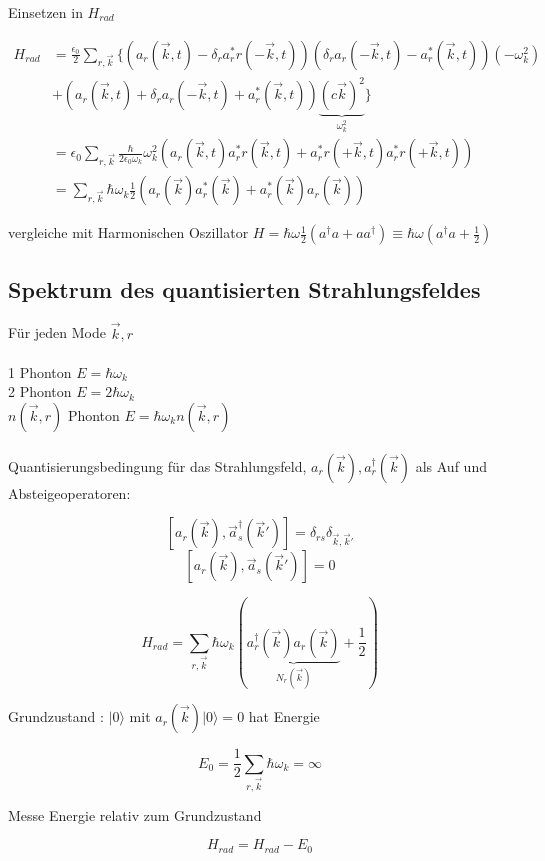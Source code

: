 Einsetzen in \(H_{rad}\)

\begin{align}
H_{rad} &= \frac{\epsilon_0}{2}\sum_{r,\vec k}\{ (a_r(\vec k,t) -\delta_r a^*_rr(-\vec k,t))(\delta_r a_r(-\vec k,t)-a^*_r(\vec k,t))(-\omega^2_k)\\
&+(a_r(\vec k,t)+\delta_r a_r(-\vec k,t) + a^*_r(\vec k,t) )\underbrace{(c\vec k)^2}_{\omega^2_k}    \}  \\
&=\epsilon_0 \sum_{r,\vec k} \frac{\hbar}{2\epsilon_0\omega_k} \omega_k^2 (a_r(\vec k,t)a^*_rr(\vec k,t)+a^*_rr(+\vec k,t)a^*_rr(+\vec k,t))\\
&= \sum_{r,\vec k} \hbar\omega_k \frac{1}{2}(a_r(\vec k)a^*_r(\vec k) + a^*_r(\vec k)a_r(\vec k))
\end{align}

vergleiche mit Harmonischen Oszillator \(H = \hbar\omega \frac{1}{2}(a^\dagger a+ aa^\dagger)\equiv \hbar\omega(a^\dagger a+\frac{1}{2})\)



\subsection{Spektrum des quantisierten Strahlungsfeldes}

Für jeden Mode \(\vec k, r\)\\
\\
1 Phonton \(E= \hbar\omega_k\)\\
2 Phonton \(E= 2\hbar\omega_k\)\\
\(n(\vec k,r)\) Phonton \(E= \hbar\omega_k n(\vec k,r)\)\\
\\

Quantisierungsbedingung für das Strahlungsfeld, \(a_r(\vec k) , a^\dagger_r(\vec k)\) als Auf und Absteigeoperatoren:

\[[a_r(\vec k), \vec a^\dagger_s(\vec k')] = \delta_{rs}\delta_{\vec k,\vec k'}\]
\[[a_r(\vec k), \vec a_s(\vec k')] = 0\]

\[H_{rad} = \sum_{r,\vec k} \hbar\omega_k(\underbrace{a_r^\dagger (\vec k)a_r(\vec k)}_{N_r(\vec k)} +\frac{1}{2})\]

Grundzustand : \(|0\rangle \) mit \(a_r(\vec k) |0\rangle  = 0\) hat Energie

\[ E_0 = \frac{1}{2} \sum_{r,\vec k}\hbar\omega_k = \infty\]

Messe Energie relativ zum Grundzustand 

\[H_{rad} = H_{rad}-E_0\]

